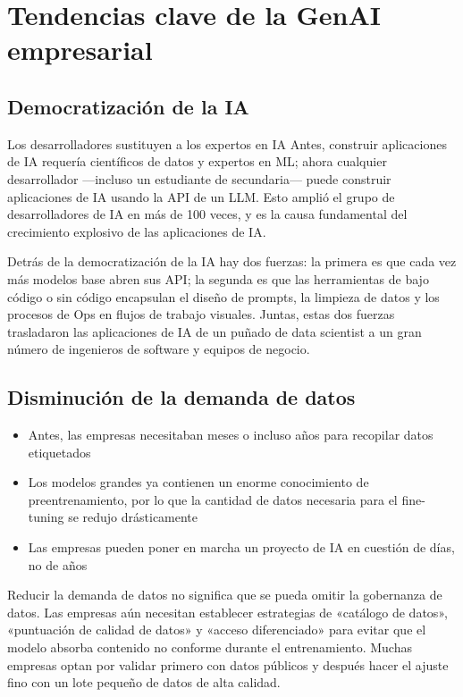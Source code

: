 \section{Tendencias clave de la GenAI empresarial}

\subsection{Democratización de la IA}

\begin{importantbox}{Los desarrolladores sustituyen a los expertos en IA}
Antes, construir aplicaciones de IA requería científicos de datos y expertos en ML; ahora cualquier desarrollador —incluso un estudiante de secundaria— puede construir aplicaciones de IA usando la API de un LLM. Esto amplió el grupo de desarrolladores de IA en más de 100 veces, y es la causa fundamental del crecimiento explosivo de las aplicaciones de IA.
\end{importantbox}

Detrás de la democratización de la IA hay dos fuerzas: la primera es que cada vez más modelos base abren sus API; la segunda es que las herramientas de bajo código o sin código encapsulan el diseño de prompts, la limpieza de datos y los procesos de Ops en flujos de trabajo visuales. Juntas, estas dos fuerzas trasladaron las aplicaciones de IA de un puñado de data scientist a un gran número de ingenieros de software y equipos de negocio.

\subsection{Disminución de la demanda de datos}

\begin{itemize}
    \item Antes, las empresas necesitaban meses o incluso años para recopilar datos etiquetados
    \item Los modelos grandes ya contienen un enorme conocimiento de preentrenamiento, por lo que la cantidad de datos necesaria para el fine-tuning se redujo drásticamente
    \item Las empresas pueden poner en marcha un proyecto de IA en cuestión de días, no de años
\end{itemize}

Reducir la demanda de datos no significa que se pueda omitir la gobernanza de datos. Las empresas aún necesitan establecer estrategias de «catálogo de datos», «puntuación de calidad de datos» y «acceso diferenciado» para evitar que el modelo absorba contenido no conforme durante el entrenamiento. Muchas empresas optan por validar primero con datos públicos y después hacer el ajuste fino con un lote pequeño de datos de alta calidad.

